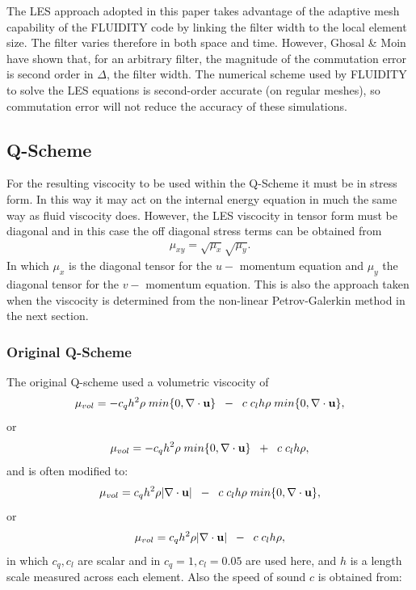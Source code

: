 The LES approach adopted in this paper takes advantage of the
adaptive mesh capability of the FLUIDITY code by linking the
filter width to the local element size. The filter varies
therefore in both space and time. However, Ghosal \& Moin
\cite{GnM95} have shown that, for an arbitrary filter, the
magnitude of the commutation error is second order in $\Delta$,
the filter width. The numerical scheme used by FLUIDITY to solve
the LES equations is second-order accurate (on regular meshes), so
commutation error will not reduce the accuracy of these
simulations.


\subsection{Q-Scheme}
For the resulting viscocity to be used within the 
Q-Scheme it must be in stress form. In this way it 
may act on the internal energy equation in much the same way 
as fluid viscocity does. However, the LES viscocity in tensor 
form must be diagonal and in this case the off diagonal 
stress terms can be obtained from 
\begin{eqnarray}
\mu_{xy}=\sqrt{\mu_x}\sqrt{\mu_y}. 
\end{eqnarray}
In which $\mu_x$ is the diagonal tensor for the $u-$ momentum equation 
and  $\mu_y$ the diagonal tensor for the $v-$ momentum equation. 
This is also the approach taken when the viscocity is determined 
from the non-linear Petrov-Galerkin method in the next section. 

\subsubsection{Original Q-Scheme}
The original Q-scheme used a volumetric viscocity of 
\begin{eqnarray}
\mu_{vol}=- c_q h^2 \rho \; min\{0, \nabla\cdot {\bf u}\} \;\; - \;\;c \;c_l  h \rho \; min\{0, \nabla\cdot {\bf u}\},
\label{original-q}
\end{eqnarray}
or
\begin{eqnarray}
\mu_{vol}=- c_q h^2 \rho \; min\{0, \nabla\cdot {\bf u}\} \;\; + \;\;c \;c_l  h \rho,
\label{original-q-b}
\end{eqnarray}
and is often modified to: 
\begin{eqnarray}
\mu_{vol}= c_q h^2 \rho \vert \nabla\cdot {\bf u}\vert \;\;-\;\; c\; c_l  h \rho \; min\{0, \nabla\cdot {\bf u}\}, 
\label{original-q2}
\end{eqnarray}
or
\begin{eqnarray}
\mu_{vol}= c_q h^2 \rho \vert \nabla\cdot {\bf u}\vert \;\;-\;\; c\; c_l  h \rho, 
\label{original-q2-b}
\end{eqnarray}
in which $c_q, c_l$ are scalar and in $c_q=1, c_l=0.05$ are used here, 
and $h$ is a length scale measured across each element. 
Also the speed of sound $c$ is obtained from:

